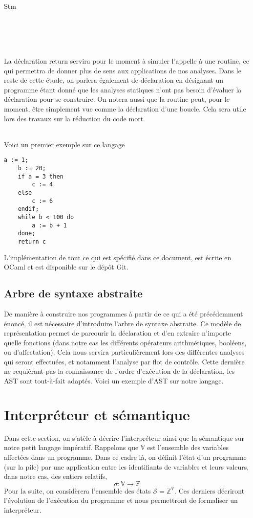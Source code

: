 \documentclass[a4paper, 10pt]{article}
\begin{document}
\begin{dtype}{Stm}
  \\
  \\
  \akind{\sskip}\\
  \\
  \\
\end{dtype}
La déclaration return servira pour le moment à simuler l'appelle à une routine, ce qui permettra de donner plus de sens aux applications de nos analyses.
Dans le reste de cette étude, on parlera également de déclaration en désignant un programme étant donné que les analyses statiques
n'ont pas besoin d'évaluer la déclaration pour se construire. On notera aussi que la routine peut, pour le moment, être
simplement vue comme la déclaration d'une boucle. Cela sera utile lors des travaux sur la réduction du code mort.
\\
\\
\begin{example}
	Voici un premier exemple sur ce langage
	\begin{lstlisting}[tabsize=2]
	a := 1;
	b := 20;
	if a = 3 then
		c := 4
	else
		c := 6
	endif;
	while b < 100 do
		a := b + 1
	done;
	return c
	\end{lstlisting}
\end{example}
L'implémentation de tout ce qui est spécifié dans ce document, est écrite en OCaml et est disponible sur le dépôt Git.

\subsection{Arbre de syntaxe abstraite}
De manière à construire nos programmes à partir de ce qui a été précédemment énoncé, il est nécessaire d'introduire 
l'arbre de syntaxe abstraite. Ce modèle de représentation permet de parcourir la déclaration et d'en extraire n'importe
quelle fonctions (dans notre cas les différents opérateurs arithmétiques, booléens, ou d'affectation). 
Cela nous servira particulièrement lors des différentes analyses qui seront effectuées, et notamment l'analyse par flot de contrôle. 
Cette dernière ne requièrant pas la connaissance de l'ordre d'exécution de la déclaration, les AST sont tout-à-fait adaptés.
Voici un exemple d'AST sur notre langage.

\section{Interpréteur et sémantique}
Dans cette section, on s'atèle à décrire l'interpréteur ainsi que la sémantique sur notre petit langage impératif. Rappelons que
$\mathbb{V}$ est l'ensemble des variables affectées dans un programme.
Dans ce cadre là, on définit l'état d'un programme (sur la pile) par une application entre les identifiants de variables et leurs valeurs, 
dans notre cas, des entiers relatifs,
\[\sigma : \mathbb{V} \longrightarrow \mathbb{Z}\]
Pour la suite, on considèrera l'ensemble des états $\mathcal{S} = \mathbb{Z}^\mathbb{V}$.
Ces derniers décriront l'évolution de l'exécution du programme et nous permettront de formaliser un interpréteur.
\end{document}
